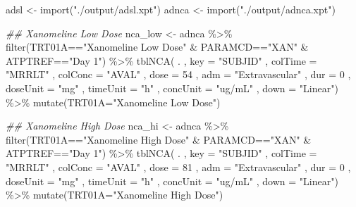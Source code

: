 \documentclass[
  letterpaper,
  DIV=11,
  numbers=noendperiod]{scrreprt}
\newenvironment{Shaded}{\begin{snugshade}}{\end{snugshade}}
\newcommand{\AttributeTok}[1]{\textcolor[rgb]{0.40,0.45,0.13}{#1}}
\newcommand{\DecValTok}[1]{\textcolor[rgb]{0.68,0.00,0.00}{#1}}
\newcommand{\DocumentationTok}[1]{\textcolor[rgb]{0.37,0.37,0.37}{\textit{#1}}}
\newcommand{\FunctionTok}[1]{\textcolor[rgb]{0.28,0.35,0.67}{#1}}
\newcommand{\NormalTok}[1]{\textcolor[rgb]{0.00,0.23,0.31}{#1}}
\newcommand{\OtherTok}[1]{\textcolor[rgb]{0.00,0.23,0.31}{#1}}
\newcommand{\SpecialCharTok}[1]{\textcolor[rgb]{0.37,0.37,0.37}{#1}}
\newcommand{\StringTok}[1]{\textcolor[rgb]{0.13,0.47,0.30}{#1}}
\begin{document}
\begin{Shaded}
\begin{Highlighting}[]
\NormalTok{adsl }\OtherTok{\textless{}{-}} \FunctionTok{import}\NormalTok{(}\StringTok{"./output/adsl.xpt"}\NormalTok{)}
\NormalTok{adnca }\OtherTok{\textless{}{-}} \FunctionTok{import}\NormalTok{(}\StringTok{"./output/adnca.xpt"}\NormalTok{)}

\DocumentationTok{\#\# Xanomeline Low Dose}
\NormalTok{nca\_low  }\OtherTok{\textless{}{-}}\NormalTok{ adnca }\SpecialCharTok{\%\textgreater{}\%}
  \FunctionTok{filter}\NormalTok{(TRT01A}\SpecialCharTok{==}\StringTok{"Xanomeline Low Dose"} \SpecialCharTok{\&} 
\NormalTok{        PARAMCD}\SpecialCharTok{==}\StringTok{"XAN"} \SpecialCharTok{\&}\NormalTok{ ATPTREF}\SpecialCharTok{==}\StringTok{"Day 1"}\NormalTok{) }\SpecialCharTok{\%\textgreater{}\%}
  \FunctionTok{tblNCA}\NormalTok{(  .}
\NormalTok{         , }\AttributeTok{key     =} \StringTok{"SUBJID"}
\NormalTok{         , }\AttributeTok{colTime =} \StringTok{"MRRLT"}
\NormalTok{         , }\AttributeTok{colConc =} \StringTok{"AVAL"}
\NormalTok{         , }\AttributeTok{dose    =}  \DecValTok{54}
\NormalTok{         , }\AttributeTok{adm     =} \StringTok{"Extravascular"}
\NormalTok{         , }\AttributeTok{dur     =}  \DecValTok{0}
\NormalTok{         , }\AttributeTok{doseUnit =} \StringTok{"mg"}
\NormalTok{         , }\AttributeTok{timeUnit =} \StringTok{"h"}
\NormalTok{         , }\AttributeTok{concUnit =} \StringTok{"ug/mL"}
\NormalTok{         , }\AttributeTok{down     =} \StringTok{"Linear"}\NormalTok{) }\SpecialCharTok{\%\textgreater{}\%}
  \FunctionTok{mutate}\NormalTok{(}\AttributeTok{TRT01A=}\StringTok{"Xanomeline Low Dose"}\NormalTok{)}

\DocumentationTok{\#\# Xanomeline High Dose}
\NormalTok{nca\_hi  }\OtherTok{\textless{}{-}}\NormalTok{ adnca }\SpecialCharTok{\%\textgreater{}\%}
  \FunctionTok{filter}\NormalTok{(TRT01A}\SpecialCharTok{==}\StringTok{"Xanomeline High Dose"} \SpecialCharTok{\&} 
\NormalTok{        PARAMCD}\SpecialCharTok{==}\StringTok{"XAN"} \SpecialCharTok{\&}\NormalTok{ ATPTREF}\SpecialCharTok{==}\StringTok{"Day 1"}\NormalTok{) }\SpecialCharTok{\%\textgreater{}\%}
  \FunctionTok{tblNCA}\NormalTok{(  .}
\NormalTok{         , }\AttributeTok{key     =} \StringTok{"SUBJID"}
\NormalTok{         , }\AttributeTok{colTime =} \StringTok{"MRRLT"}
\NormalTok{         , }\AttributeTok{colConc =} \StringTok{"AVAL"}
\NormalTok{         , }\AttributeTok{dose    =}  \DecValTok{81}
\NormalTok{         , }\AttributeTok{adm     =} \StringTok{"Extravascular"}
\NormalTok{         , }\AttributeTok{dur     =}  \DecValTok{0}
\NormalTok{         , }\AttributeTok{doseUnit =} \StringTok{"mg"}
\NormalTok{         , }\AttributeTok{timeUnit =} \StringTok{"h"}
\NormalTok{         , }\AttributeTok{concUnit =} \StringTok{"ug/mL"}
\NormalTok{         , }\AttributeTok{down     =} \StringTok{"Linear"}\NormalTok{) }\SpecialCharTok{\%\textgreater{}\%}
  \FunctionTok{mutate}\NormalTok{(}\AttributeTok{TRT01A=}\StringTok{"Xanomeline High Dose"}\NormalTok{)}


\end{Highlighting}
\end{Shaded}
\end{document}

